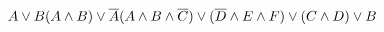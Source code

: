 \documentclass[preview]{standalone}
\begin{document}
\begin{center}
${A\lor B}\\ {\displaystyle (A\land B)\lor {\overline {A}}}\\ {\displaystyle (A\land B\land {\overline {C}})\lor ({\overline {D}}\land E\land F)\lor (C\land D)\lor B}$
\end{center}
\end{document}
